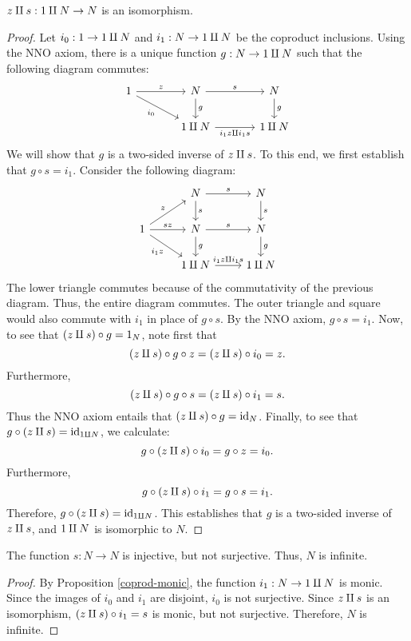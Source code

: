 \begin{prop} $z\amalg s:1\amalg N\to N$ is an
  isomorphism. \label{nno-coproduct}
\end{prop}

\begin{proof} Let $i_0:1\to 1\amalg N$ and $i_1:N\to 1\amalg N$ be the
  coproduct inclusions.  Using the NNO axiom, there is a unique
  function $g:N\to 1\amalg N$ such that the following diagram commutes:
  \[ \begin{tikzcd}[column sep=large] 1 \arrow[r,"z"]
    \arrow[dr,"i_0"'] & N \arrow[r,"s"] \arrow[d,"g"] & N
    \arrow[d,"g"] \\
    & 1\cpr N \arrow[r,"i_1z\cpr i_1s"'] & 1\cpr N \end{tikzcd} \] We will
  show that $g$ is a two-sided inverse of $z\amalg s$.  To this end,
  we first establish that $g\circ s=i_1$.  Consider the following
  diagram:
  \[ \begin{tikzcd}
    & N \arrow[r,"s"] \arrow[d,"s"] & N \arrow[d,"s"] \\
    1 \arrow[ur,"z"] \arrow[r,"sz"] \arrow[dr,"i_1z"'] & N
    \arrow[d,"g"]
    \arrow[r,"s"] & N \arrow[d,"g"] \\
    & 1\cpr N \arrow[r,"i_1z\cpr i_1s"] & 1\cpr N \end{tikzcd} \] The lower
  triangle commutes because of the commutativity of the previous
  diagram.  Thus, the entire diagram commutes.  The outer triangle and
  square would also commute with $i_1$ in place of $g\circ s$.  By the
  NNO axiom, $g\circ s=i_1$.  Now, to see that $(z\amalg s)\circ
  g=1_N$, note first that
\[ (z\amalg s)\circ g\circ z = (z\amalg s)\circ i_0 = z .\]
Furthermore,
\[ (z\amalg s)\circ g\circ s = (z\amalg s)\circ i_1 = s .\] Thus the
NNO axiom entails that $(z\amalg s)\circ g=\mathrm{id}_N$.  Finally,
to see that $g\circ (z\amalg s)=\mathrm{id}_{1\amalg N}$, we calculate:
\[ g\circ (z\amalg s)\circ i_0 = g\circ z = i_0 .\]
Furthermore, 
\[ g\circ (z\amalg s)\circ i_1 = g\circ s = i_1 .\] Therefore, $g\circ
(z\amalg s)=\mathrm{id}_{1\amalg N}$.  This establishes that $g$ is a
two-sided inverse of $z\amalg s$, and $1\amalg N$ is isomorphic to $N$.
\end{proof}


\begin{prop} The function $s:N\to N$ is injective, but not surjective.
  Thus, $N$ is infinite. \label{succ-monic} \end{prop}

\begin{proof} By Proposition \ref{coprod-monic}, the function
  $i_1:N\to 1\amalg N$ is monic.  Since the images of $i_0$ and $i_1$
  are disjoint, $i_0$ is not surjective.  Since $z\amalg s$ is an
  isomorphism, $(z\amalg s)\circ i_1=s$ is monic, but not surjective.
  Therefore, $N$ is infinite.
\end{proof}





